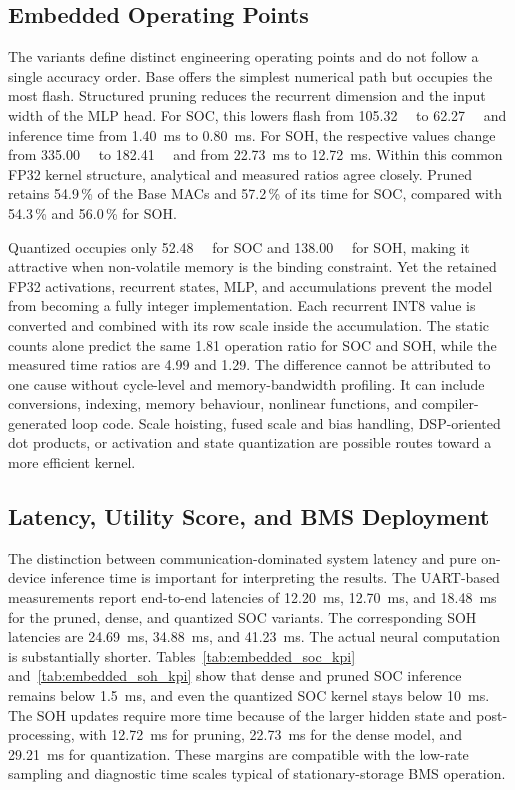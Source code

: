 \documentclass[
    a4paper,
    12pt,
    titlepage,
    bibliography=totoc,
    twoside=on,
    parskip=false,
    numbers=noenddot,
    cleardoublepage=empty,
    DIV=12,
    BCOR=12.0mm,
    headheight=36pt,
    headings=openright
]{scrreprt}
\begin{document}
\subsection{Embedded Operating Points}
The variants define distinct engineering operating points and do not follow a single accuracy order. Base offers the simplest numerical path but occupies the most flash. Structured pruning reduces the recurrent dimension and the input width of the MLP head. For SOC, this lowers flash from \SI{105.32}{\kilo\byte} to \SI{62.27}{\kilo\byte} and inference time from \SI{1.40}{\milli\second} to \SI{0.80}{\milli\second}. For SOH, the respective values change from \SI{335.00}{\kilo\byte} to \SI{182.41}{\kilo\byte} and from \SI{22.73}{\milli\second} to \SI{12.72}{\milli\second}. Within this common FP32 kernel structure, analytical and measured ratios agree closely. Pruned retains 54.9\,\% of the Base MACs and 57.2\,\% of its time for SOC, compared with 54.3\,\% and 56.0\,\% for SOH.

Quantized occupies only \SI{52.48}{\kilo\byte} for SOC and \SI{138.00}{\kilo\byte} for SOH, making it attractive when non-volatile memory is the binding constraint. Yet the retained FP32 activations, recurrent states, MLP, and accumulations prevent the model from becoming a fully integer implementation. Each recurrent INT8 value is converted and combined with its row scale inside the accumulation. The static counts alone predict the same 1.81 operation ratio for SOC and SOH, while the measured time ratios are 4.99 and 1.29. The difference cannot be attributed to one cause without cycle-level and memory-bandwidth profiling. It can include conversions, indexing, memory behaviour, nonlinear functions, and compiler-generated loop code. Scale hoisting, fused scale and bias handling, DSP-oriented dot products, or activation and state quantization are possible routes toward a more efficient kernel.

\subsection{Latency, Utility Score, and BMS Deployment}
The distinction between communication-dominated system latency and pure on-device inference time is important for interpreting the results. The UART-based measurements report end-to-end latencies of \SI{12.20}{\milli\second}, \SI{12.70}{\milli\second}, and \SI{18.48}{\milli\second} for the pruned, dense, and quantized SOC variants. The corresponding SOH latencies are \SI{24.69}{\milli\second}, \SI{34.88}{\milli\second}, and \SI{41.23}{\milli\second}. The actual neural computation is substantially shorter. Tables~\ref{tab:embedded_soc_kpi} and~\ref{tab:embedded_soh_kpi} show that dense and pruned SOC inference remains below \SI{1.5}{\milli\second}, and even the quantized SOC kernel stays below \SI{10}{\milli\second}. The SOH updates require more time because of the larger hidden state and post-processing, with \SI{12.72}{\milli\second} for pruning, \SI{22.73}{\milli\second} for the dense model, and \SI{29.21}{\milli\second} for quantization. These margins are compatible with the low-rate sampling and diagnostic time scales typical of stationary-storage BMS operation.\autocite{plettBatteryManagementSystems2015,berecibarCriticalReviewState2016}
\end{document}
